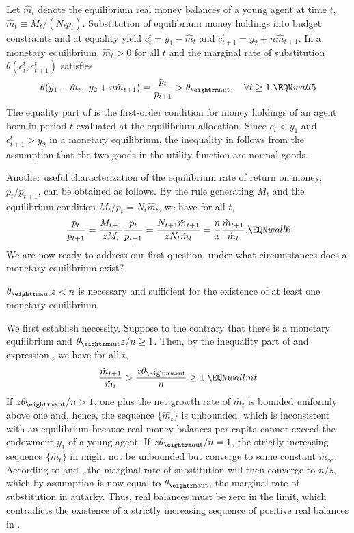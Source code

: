 Let $\hat m_t$ denote the equilibrium real money
balances of a young agent at time $t$,
$\hat m_t \equiv M_t / (N_t p_t)$. Substitution of equilibrium money
holdings into budget constraints  and  at equality
yield $c^t_t= y_1 - \hat m_t$ and $c^t_{t+1}=y_2 + n \hat m_{t+1}$.
In a monetary equilibrium, $\hat m_t > 0$ for all $t$ and the
marginal rate of substitution $\theta(c^t_t,c^t_{t+1})$ satisfies
$$
\theta(y_1- \hat m_t, \ y_2 + n \hat m_{t+1}) = { p_t \over p_{t+1} }
> \theta_{\rm aut},   \quad  \forall t \geq 1 .            \EQN wall5
$$
The equality part of  is the first-order condition for money
holdings of an agent born in period $t$ evaluated at the equilibrium
allocation. Since $c^t_t <y_1$ and $c^t_{t+1} > y_2$ in a monetary
equilibrium, the inequality in
 follows from the assumption that the two goods in the
utility function are normal goods.

Another useful characterization of the equilibrium rate of return on
money, $p_t/p_{t+1}$, can be obtained as follows.
By the rule generating $M_t$ and the equilibrium condition
$M_t/p_t=N_t \hat m_t$, we have for all $t$,
$$
{p_t \over p_{t+1}} = {M_{t+1} \over z M_t} {p_t \over p_{t+1}}
= {N_{t+1} \hat m_{t+1} \over z N_t \hat m_t}
= {n \over z} {\hat m_{t+1} \over \hat m_t}.                 \EQN wall6
$$
We are now ready to address our first question, under what circumstances
does a monetary equilibrium exist?

\medskip
{}  $\theta_{\rm aut} z < n$ is necessary
and sufficient for the existence of at least one monetary equilibrium.
\medskip

We first establish necessity. Suppose to the contrary that there is
a monetary equilibrium and $\theta_{\rm aut} z / n \geq 1$. Then,
by the inequality part of  and expression ,
we have for all $t$,
$$
{\hat m_{t+1} \over \hat m_t}  > { z \theta_{\rm aut} \over n} \geq 1. \EQN wallmt
$$
If $z \theta_{\rm aut} / n > 1$, one plus the net growth rate of $\hat m_t$ is
bounded uniformly above one and, hence,
the sequence $\{\hat m_t\}$ is unbounded, which is
inconsistent with an equilibrium because real money balances per capita
cannot exceed the endowment $y_1$ of a young agent.
If $z \theta_{\rm aut} / n = 1$, the strictly increasing sequence
$\{\hat m_t\}$ in  might not be unbounded but converge
to some constant $\hat m_\infty$.
According to  and , the marginal rate
of substitution will then converge to $n/z$, which by assumption is now
equal to $\theta_{\rm aut}$, the marginal rate of substitution in
autarky. Thus, real balances must be zero in the limit, which contradicts
the existence of a strictly increasing sequence of positive real balances
in .

